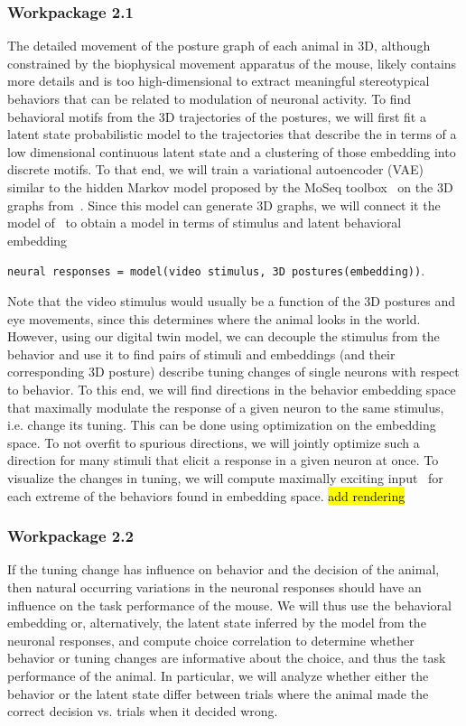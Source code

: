 \documentclass[B2,COG]{ercgrant}
\begin{document}
\subsubsection{Workpackage 2.1\hfill {}}
The detailed movement of the posture graph of each animal in 3D, although constrained by the biophysical movement apparatus of the mouse, likely contains more details and is too high-dimensional to extract meaningful stereotypical behaviors that can be related to modulation of neuronal activity. 
To find behavioral motifs from the 3D trajectories of the postures, we will first fit a latent state probabilistic model to the trajectories that describe the in terms of a low dimensional continuous latent state and a clustering of those embedding into discrete motifs.
To that end, we will train a variational autoencoder (VAE) similar to the hidden Markov model proposed by the MoSeq toolbox~\parencite{Wiltschko2015-ey, Wiltschko2020-zd} on the 3D graphs from~.
Since this model can generate 3D graphs, we will connect it the model of~ to obtain a model in terms of stimulus and latent behavioral embedding
\begin{center}
    \texttt{neural responses = model(video stimulus, 3D postures(embedding))}.
\end{center}
Note that the video stimulus would usually be a function of the 3D postures and eye movements, since this determines where the animal looks in the world. 
However, using our digital twin model, we can decouple the stimulus from the behavior and use it to find pairs of stimuli and embeddings (and their corresponding 3D posture) describe tuning changes of single neurons with respect to behavior. 
To this end, we will find directions in the behavior embedding space that maximally modulate the response of a given neuron to the same stimulus, i.e. change its tuning.
This can be done using optimization on the embedding space. 
To not overfit to spurious directions, we will jointly optimize such a direction for many stimuli that elicit a response in  a given neuron at once. 
To visualize the changes in tuning, we will compute maximally exciting input~\parencite[MEIs][]{Walker2019-yw} for each extreme of the behaviors found in embedding space. 
\hl{add rendering}

\subsubsection{Workpackage 2.2\hfill {}}
If the tuning change has influence on behavior and the decision of the animal, then natural occurring variations in the neuronal responses should have an influence on the task performance of the mouse. 
We will thus use the behavioral embedding or, alternatively, the latent state inferred by the model from the neuronal responses, and compute choice correlation to determine whether behavior or tuning changes are informative about the choice, and thus the task performance of the animal. 
In particular, we will analyze whether either the behavior or the latent state differ between trials where the animal made the correct decision vs. trials when it decided wrong. 
\end{document}
